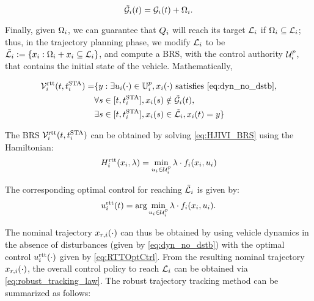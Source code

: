 \begin{equation} 
\label{eqn:rttAugObs}
\tilde{\mathcal{G}}_i(t) = \mathcal{G}_i(t) + \Omega_i.
\end{equation}

Finally, given $\Omega_i$, we can guarantee that $Q_i$ will reach its target $\mathcal{L}_i$ if $\Omega_i \subseteq \mathcal{L}_i$; thus, in the trajectory planning phase, we modify $\mathcal{L}_i$ to be $\tilde{\mathcal{L}}_i := \{x_i: \Omega_i + x_i \subseteq \mathcal{L}_i\}$, and compute a BRS, with the control authority $\mathcal{U}^p_i$, that contains the initial state of the vehicle. Mathematically,

\begin{equation}
\label{eq:rttBRS}
\begin{aligned}
\mathcal{V}_i^\text{rtt}(t, t^\text{STA}_i) = & \{y: \exists u_i(\cdot) \in \mathbb{U}^p_i, x_i(\cdot) \text{ satisfies \eqref{eq:dyn_no_dstb}},\\
&\forall s \in [t, t^\text{STA}_i], x_i(s) \notin \tilde{\mathcal{G}}_i(t), \\
& \exists s \in [t, t^\text{STA}_i], x_i(s) \in \tilde{\mathcal{L}}_i, x_i(t) = y\}
\end{aligned}
\end{equation}

The BRS $\mathcal{V}_i^\text{rtt}(t, t^\text{STA}_i)$ can be obtained by solving \eqref{eq:HJIVI_BRS} using the Hamiltonian: 
\begin{equation}
\label{eq:RTTham}
H_i^\text{rtt}(x_i, \lambda) = \min_{u_i \in \mathcal{U}^p_i } \lambda \cdot f_i(x_i, u_i)
\end{equation}

The corresponding optimal control for reaching $\tilde{\mathcal{L}}_i$ is given by:
\begin{equation}
\label{eq:RTTOptCtrl}
u_i^\text{rtt}(t) = \arg \min_{u_i \in \mathcal{U}^p_i } \lambda \cdot f_i(x_i, u_i).
\end{equation}

The nominal trajectory $x_{r,i}(\cdot)$ can thus be obtained by using vehicle dynamics in the absence of disturbances (given by \eqref{eq:dyn_no_dstb}) with the optimal control  $u_i^\text{rtt}(\cdot)$ given by \eqref{eq:RTTOptCtrl}. From the resulting nominal trajectory $x_{r,i}(\cdot)$, the overall control policy to reach $\mathcal{L}_i$ can be obtained via \eqref{eq:robust_tracking_law}. The robust trajectory tracking method can be summarized as follows:

